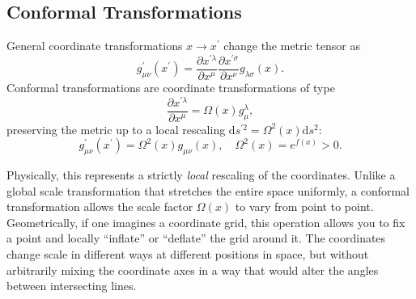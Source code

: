 \subsection{Conformal Transformations}
General coordinate transformations \(x\rightarrow x^{\prime}\) change the metric tensor as
\[
    g_{\mu\nu}^{\prime}(x^{\prime})=\frac{\partial x^{\prime\lambda}}{\partial x^{\mu}}\frac{\partial x^{\prime\sigma}}{\partial x^{\nu}}g_{\lambda\sigma}(x).
\]
Conformal transformations are coordinate transformations of type
\[
    \frac{\partial x^{\prime\lambda}}{\partial x^{\mu}}=\Omega(x)g^{\lambda}_\mu,
\]
preserving the metric up to a local rescaling \(\mathrm{d}s^{\prime 2} = \Omega^{2}(x)\mathrm{d}s^2 \):
\[
    g_{\mu\nu}^{\prime}(x^{\prime})=\Omega^{2}(x)g_{\mu\nu}(x), \quad \Omega^{2}(x)=e^{f(x)}>0.
\]

Physically, this represents a strictly \textit{local} rescaling of the coordinates. Unlike a global scale transformation that stretches the entire space uniformly, a conformal transformation allows the scale factor \(\Omega(x)\) to vary from point to point. Geometrically, if one imagines a coordinate grid, this operation allows you to fix a point and locally ``inflate'' or ``deflate'' the grid around it. The coordinates change scale in different ways at different positions in space, but without arbitrarily mixing the coordinate axes in a way that would alter the angles between intersecting lines.

